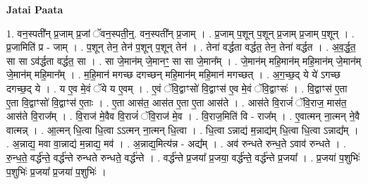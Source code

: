 \documentclass[17pt]{extarticle}
\begin{document}
\textbf{Jatai Paata} \newline

1. वन॒स्पती᳚न् प्र॒जाम् प्र॒जां ॅवन॒स्पती॒न्॒. वन॒स्पती᳚न् प्र॒जाम् । . प्र॒जाम् प॒शून् प॒शून् प्र॒जाम् प्र॒जाम् प॒शून् । . प्र॒जामिति॑ प्र - जाम् । . प॒शून् तेन॒ तेन॑ प॒शून् प॒शून् तेन॑ । . तेना॑ वर्द्धता वर्द्धत॒ तेन॒ तेना॑ वर्द्धत । . अ॒व॒र्द्ध॒त॒ सा सा ऽव॑र्द्धता वर्द्धत॒ सा । . सा जे॒मान॑म् जे॒मानꣳ॒॒ सा सा जे॒मान᳚म् । . जे॒मान॑म् महि॒मान॑म् महि॒मान॑म् जे॒मान॑म् जे॒मान॑म् महि॒मान᳚म् । . म॒हि॒मान॑ मगच्छ दगच्छन् महि॒मान॑म् महि॒मान॑ मगच्छत् । . अ॒ग॒च्छ॒द् ये ये॑ ऽगच्छ दगच्छ॒द् ये । . य ए॒व मे॒वं ॅये य ए॒वम् । . ए॒वं ॅवि॒द्वाꣳसो॑ वि॒द्वाꣳस॑ ए॒व मे॒वं ॅवि॒द्वाꣳसः॑ । . वि॒द्वाꣳस॑ ए॒ता ए॒ता वि॒द्वाꣳसो॑ वि॒द्वाꣳस॑ ए॒ताः । . ए॒ता आस॑त॒ आस॑त ए॒ता ए॒ता आस॑ते । . आस॑ते वि॒राजं॑ ॅवि॒राज॒ मास॑त॒ आस॑ते वि॒राज᳚म् । . वि॒राज॑ मे॒वैव वि॒राजं॑ ॅवि॒राज॑ मे॒व । . वि॒राज॒मिति॑ वि - राज᳚म् । . ए॒वात्मन् ना॒त्मन् ने॒वै वात्मन्न् । . आ॒त्मन् धि॒त्वा धि॒त्वा ऽऽत्मन् ना॒त्मन् धि॒त्वा । . धि॒त्वा ऽन्नाद्य॑ म॒न्नाद्य॑म् धि॒त्वा धि॒त्वा ऽन्नाद्य᳚म् । . अ॒न्नाद्य॒ मवा वा॒न्नाद्य॑ म॒न्नाद्य॒ मव॑ । . अ॒न्नाद्य॒मित्य॑न्न - अद्य᳚म् । . अव॑ रुन्धते रुन्ध॒ते ऽवाव॑ रुन्धते । . रु॒न्ध॒ते॒ वर्द्ध॑न्ते॒ वर्द्ध॑न्ते रुन्धते रुन्धते॒ वर्द्ध॑न्ते । . वर्द्ध॑न्ते प्र॒जया᳚ प्र॒जया॒ वर्द्ध॑न्ते॒ वर्द्ध॑न्ते प्र॒जया᳚ । . प्र॒जया॑ प॒शुभिः॑ प॒शुभिः॑ प्र॒जया᳚ प्र॒जया॑ प॒शुभिः॑ । \newline
\end{document}
